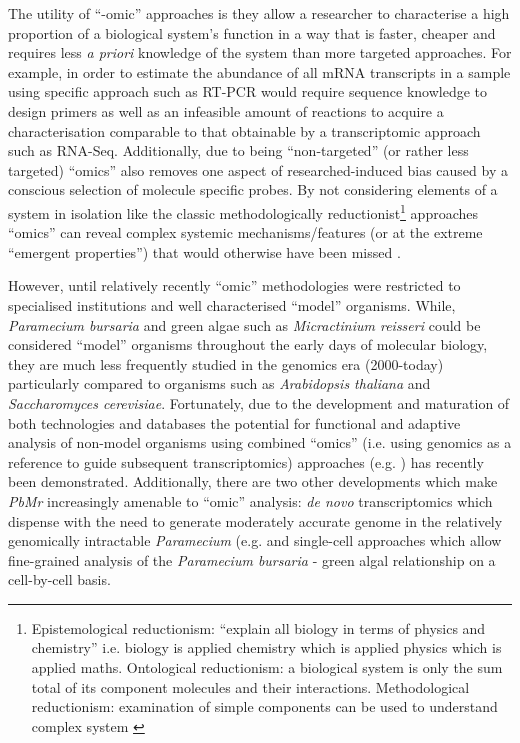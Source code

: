 The utility of ``-omic'' approaches is they allow a researcher to characterise a high proportion 
of a biological system's function in a way that is faster, cheaper and requires less \textit{a priori} 
knowledge of the system than more targeted approaches.
For example, in order to estimate the abundance of all mRNA transcripts in a sample using specific
approach such as RT-PCR would require sequence knowledge to design primers as well as an infeasible amount of
reactions to acquire a characterisation comparable to that obtainable by a transcriptomic approach such as RNA-Seq. 
Additionally, due to being ``non-targeted'' (or rather less targeted) ``omics'' also removes one aspect of 
researched-induced bias caused by a conscious selection of molecule specific probes.
By not considering elements of a system in isolation like the classic methodologically reductionist\footnote{
    Epistemological reductionism: ``explain all biology in terms of physics and chemistry'' \citep{Crick1966}
    i.e. biology is applied chemistry which is applied physics which is applied maths. 
    Ontological reductionism: a biological system is only the sum total of its component molecules and their
    interactions.
    Methodological reductionism: examination of simple components can be used to understand complex system \citep{Fang2011}}
approaches ``omics'' can reveal complex systemic mechanisms/features (or at the extreme ``emergent properties'') that would
otherwise have been missed \citep{Fang2011}.  


However, until relatively recently ``omic'' methodologies were restricted to specialised 
institutions and well characterised ``model'' organisms.  
While, \textit{Paramecium bursaria} and green algae such as \textit{Micractinium
reisseri} could be considered ``model'' organisms throughout the early days of 
molecular biology, they are much less frequently studied in the genomics
era (2000-today) particularly compared to organisms such as \textit{Arabidopsis thaliana} and \textit{Saccharomyces
cerevisiae}. Fortunately, due to the development and maturation of both technologies and databases 
the potential for functional and adaptive analysis of non-model organisms using 
combined ``omics'' (i.e. using genomics as a reference to guide subsequent transcriptomics) approaches 
(e.g. \citep{Munoz-Merida2013,Feldmesser2014}) has recently been demonstrated.  
Additionally, there are two other developments which make \textit{PbMr} increasingly amenable to
``omic'' analysis: \textit{de novo} transcriptomics which dispense with the need to generate
moderately accurate genome in the relatively genomically intractable \textit{Paramecium} (e.g. \citep{Kodama2014}  and
single-cell approaches which allow fine-grained analysis of the \textit{Paramecium bursaria}
- green algal relationship on a cell-by-cell basis.


